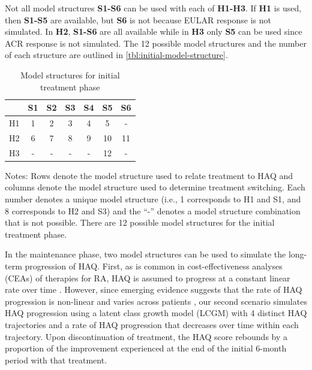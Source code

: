 \documentclass[11pt,final,fleqn]{article}\usepackage[]{graphicx}\usepackage[]{color}
\theoremstyle{plain}
\begin{document}
Not all model structures \textbf{S1-S6} can be used with each of \textbf{H1-H3}. If \textbf{H1} is used, then \textbf{S1-S5} are available, but \textbf{S6} is not because EULAR response is not simulated. In \textbf{H2}, \textbf{S1-S6} are all available while in \textbf{H3} only \textbf{S5} can be used since ACR response is not simulated. The 12 possible model structures and the number of each structure are outlined in \autoref{tbl:initial-model-structure}.  

\begin{table}[!ht] 
\begin{center}
\begin{threeparttable}
\caption{Model structures for initial treatment phase} \label{tbl:initial-model-structure}
\begin{tabularx}{\textwidth}{@{\extracolsep{\fill}}lcccccc}
\hline
\multicolumn{1}{l}{} & \multicolumn{1}{c}{S1} & \multicolumn{1}{c}{S2} & \multicolumn{1}{c}{S3} & \multicolumn{1}{c}{S4} & \multicolumn{1}{c}{S5} & \multicolumn{1}{c}{S6}  \\
\hline
H1 & 1 & 2 & 3 & 4 & 5 & - \\
H2 & 6 & 7 & 8 & 9 & 10 & 11 \\
H3 & - & - & - & - & 12  & -\\
\hline
\end{tabularx}
\scriptsize
Notes: Rows denote the model structure used to relate treatment to HAQ and columns denote the model structure used to determine treatment switching. Each number denotes a unique model structure (i.e., 1 corresponds to H1 and S1, and 8 corresponds to H2 and S3) and the ``-'' denotes a model structure combination that is not possible. There are 12 possible model structures for the initial treatment phase. 
\end{threeparttable}
\end{center}
\end{table}

In the maintenance phase, two model structures can be used to simulate the long-term progression of HAQ. First, as is common in cost-effectiveness analyses (CEAs) of therapies for RA, HAQ is assumed to progress at a constant linear rate over time \citep[see][]{tosh2011sheffield, wailoo2008biologic}. However, since emerging evidence suggests that the rate of HAQ progression is non-linear and varies across patients \citep{gibson2016haq}, our second scenario simulates HAQ progression using a latent class growth model (LCGM) \citep{norton2014health} with 4 distinct HAQ trajectories and a rate of HAQ progression that decreases over time within each trajectory. Upon discontinuation of treatment, the HAQ score rebounds by a proportion of the improvement experienced at the end of the initial 6-month period with that treatment.
\end{document}
